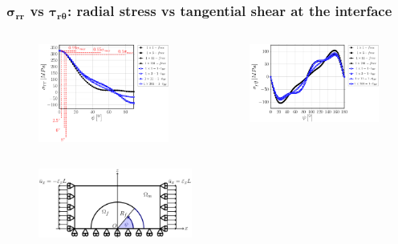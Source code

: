 \documentclass[first,firstsupp,lastsupp,last,hyperref,table]{ETHclass}
\begin{document}
\begin{frame}
\frametitle{\vspace{0.2cm}\small $\mathbf{\sigma_{rr}}$ vs $\mathbf{\tau_{r\theta}}$: radial stress vs tangential shear at the interface}
\vspace{-.75cm}
\centering
\begin{columns}[c]
\centering
\begin{column}{0.5\textwidth}
\centering
\begin{figure}
\centering
\includegraphics[width=\columnwidth]{vf60-nodamage-sigmar.pdf}
\end{figure}
\end{column}
\begin{column}{0.5\textwidth}
\centering
\begin{figure}
\centering
\includegraphics[width=\columnwidth]{vf60-nodamage-taurt.pdf}
\end{figure}
\end{column}
\end{columns}
\vspace{-0.25cm}
\centering
\begin{figure}
\centering
\includegraphics[width=0.45\textwidth]{refAngle.pdf}
\end{figure}
\end{frame}
\end{document}
